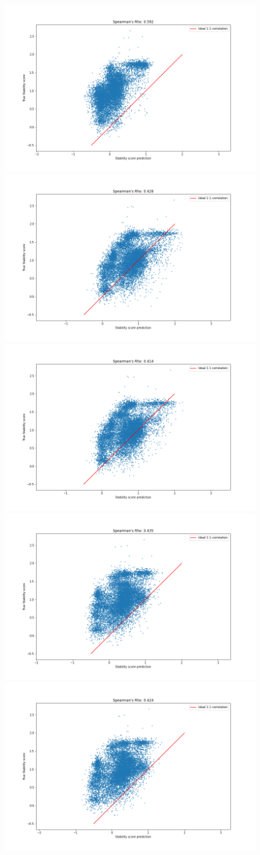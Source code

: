 \begin{figure}[!ht]
  \includegraphics[width=0.49\linewidth]{latex/imgs/spearman_1_layer_no_schedule_512_minloss.png}
  \includegraphics[width=0.49\linewidth]{latex/imgs/spearman_1_layer_with_schedule_512_final.png}
  \includegraphics[width=0.49\linewidth]{latex/imgs/spearman_1_layer_with_schedule_512_minloss.png}
  \includegraphics[width=0.49\linewidth]{latex/imgs/spearman_1_layer_with_schedule_256_final.png}
  \includegraphics[width=0.49\linewidth]{latex/imgs/spearman_1_layer_with_schedule_256_minloss.png}

\end{figure}
